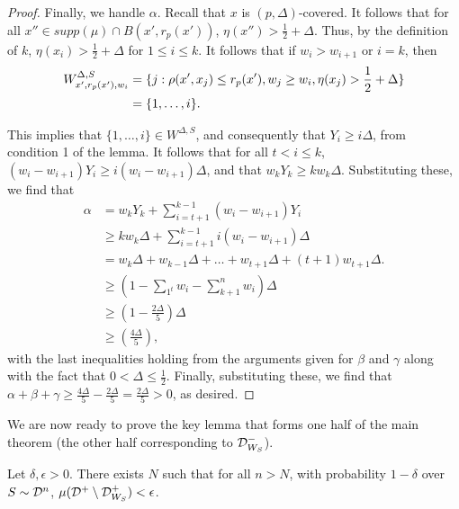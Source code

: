 \begin{proof}
Finally, we handle $\alpha$. Recall that $x$ is $(p, \Delta)$-covered. It follows that for all $x'' \in supp(\mu) \cap B(x', r_p(x'))$, $\eta(x'') > \frac{1}{2} + \Delta$. Thus, by the definition of $k$, $\eta(x_i) > \frac{1}{2} + \Delta$ for $1 \leq i \leq k$. It follows that if $w_i > w_{i+1}$ or $i = k$, then 
\begin{equation*}
\begin{split}
W_{x', r_p(x'), w_i}^{\Delta, S} &= \{j: \rho(x', x_j) \leq r_p(x'), w_j \geq w_i, \eta(x_j) > \frac{1}{2} + \Delta\} \\
&= \{1, \dots, i\}.
\end{split}
\end{equation*}

This implies that $\{1, \dots, i\} \in W^{\Delta, S}$, and consequently that $Y_i \geq i\Delta$, from condition 1 of the lemma. It follows that for all $t < i \leq k$, $(w_{i} - w_{i+1})Y_i \geq i(w_i - w_{i+1})\Delta$, and that $w_kY_k \geq kw_k\Delta$. Substituting these, we find that 
\begin{equation*}
\begin{split}
\alpha &= w_kY_k + \sum_{i = t+1}^{k-1} (w_i - w_{i+1})Y_i \\
&\geq kw_k\Delta + \sum_{i = t + 1}^{k-1} i(w_i - w_{i+1})\Delta \\
&= w_k\Delta + w_{k-1}\Delta + \dots + w_{t+1}\Delta + (t+1)w_{t+1}\Delta. \\
&\geq (1 - \sum_{1^t} w_i - \sum_{k+1}^n w_i)\Delta \\
&\geq (1 - \frac{2\Delta}{5})\Delta \\
&\geq (\frac{4\Delta}{5}),
\end{split}
\end{equation*}
with the last inequalities holding from the arguments given for $\beta$ and $\gamma$ along with the fact that $0 < \Delta \leq  \frac{1}{2}$. Finally, substituting these, we find that $\alpha + \beta + \gamma \geq \frac{4\Delta}{5} - \frac{2\Delta}{5} = \frac{2\Delta}{5} > 0$, as desired. 
\end{proof}

We are now ready to prove the key lemma that forms one half of the main theorem (the other half corresponding to ${\mathcal D}_{W_S}^-$). 

\begin{lem}
Let $\delta, \epsilon > 0$. There exists $N$ such that for all $n > N$, with probability $1 - \delta$ over $S \sim {\mathcal D}^n$, $\mu({\mathcal D}^+ \setminus {\mathcal D}_{W_S}^+) < \epsilon$. 
\end{lem}

